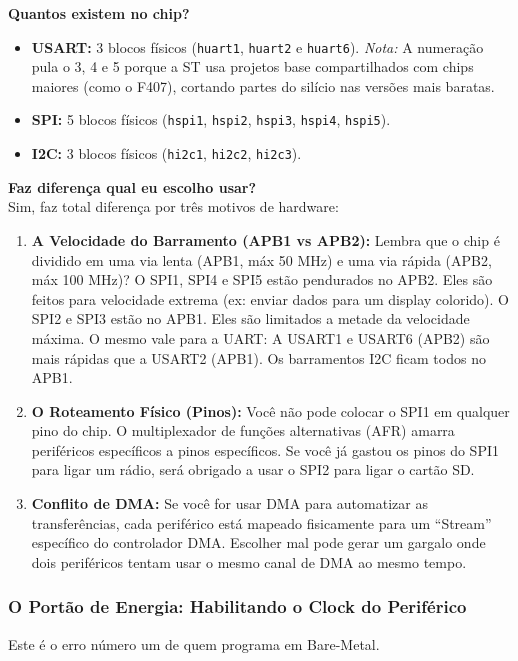 \documentclass[12pt,a4paper]{article}
\begin{document}
\textbf{Quantos existem no chip?}
\begin{itemize}
    \item \textbf{USART:} 3 blocos físicos (\texttt{huart1}, \texttt{huart2} e \texttt{huart6}). \textit{Nota:} A numeração pula o 3, 4 e 5 porque a ST usa projetos base compartilhados com chips maiores (como o F407), cortando partes do silício nas versões mais baratas.
    \item \textbf{SPI:} 5 blocos físicos (\texttt{hspi1}, \texttt{hspi2}, \texttt{hspi3}, \texttt{hspi4}, \texttt{hspi5}).
    \item \textbf{I2C:} 3 blocos físicos (\texttt{hi2c1}, \texttt{hi2c2}, \texttt{hi2c3}).
\end{itemize}

\textbf{Faz diferença qual eu escolho usar?}\\
Sim, faz total diferença por três motivos de hardware:
\begin{enumerate}
    \item \textbf{A Velocidade do Barramento (APB1 vs APB2):} Lembra que o chip é dividido em uma via lenta (APB1, máx 50 MHz) e uma via rápida (APB2, máx 100 MHz)? O SPI1, SPI4 e SPI5 estão pendurados no APB2. Eles são feitos para velocidade extrema (ex: enviar dados para um display colorido). O SPI2 e SPI3 estão no APB1. Eles são limitados a metade da velocidade máxima. O mesmo vale para a UART: A USART1 e USART6 (APB2) são mais rápidas que a USART2 (APB1). Os barramentos I2C ficam todos no APB1.
    \item \textbf{O Roteamento Físico (Pinos):} Você não pode colocar o SPI1 em qualquer pino do chip. O multiplexador de funções alternativas (AFR) amarra periféricos específicos a pinos específicos. Se você já gastou os pinos do SPI1 para ligar um rádio, será obrigado a usar o SPI2 para ligar o cartão SD.
    \item \textbf{Conflito de DMA:} Se você for usar DMA para automatizar as transferências, cada periférico está mapeado fisicamente para um ``Stream'' específico do controlador DMA. Escolher mal pode gerar um gargalo onde dois periféricos tentam usar o mesmo canal de DMA ao mesmo tempo.
\end{enumerate}

\subsubsection{O Portão de Energia: Habilitando o Clock do Periférico}
Este é o erro número um de quem programa em Bare-Metal.
\end{document}
